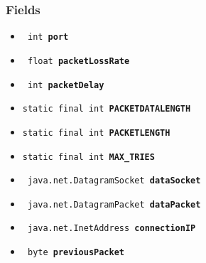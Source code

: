 {{{{\subsubsection{Fields}{
\begin{itemize}
\item{
\label{filetransferUDP.FileTransfer.port}\hypertarget{filetransferUDP.FileTransfer.port}{\texttt{ int\ {\bf  port}}
}
}
\item{
\label{filetransferUDP.FileTransfer.packetLossRate}\hypertarget{filetransferUDP.FileTransfer.packetLossRate}{\texttt{ float\ {\bf  packetLossRate}}
}
}
\item{
\label{filetransferUDP.FileTransfer.packetDelay}\hypertarget{filetransferUDP.FileTransfer.packetDelay}{\texttt{ int\ {\bf  packetDelay}}
}
}
\item{
\label{filetransferUDP.FileTransfer.PACKETDATALENGTH}\hypertarget{filetransferUDP.FileTransfer.PACKETDATALENGTH}{\texttt{static final int\ {\bf  PACKETDATALENGTH}}
}
}
\item{
\label{filetransferUDP.FileTransfer.PACKETLENGTH}\hypertarget{filetransferUDP.FileTransfer.PACKETLENGTH}{\texttt{static final int\ {\bf  PACKETLENGTH}}
}
}
\item{
\label{filetransferUDP.FileTransfer.MAX_TRIES}\hypertarget{filetransferUDP.FileTransfer.MAX_TRIES}{\texttt{static final int\ {\bf  MAX\_TRIES}}
}
}
\item{
\label{filetransferUDP.FileTransfer.dataSocket}\hypertarget{filetransferUDP.FileTransfer.dataSocket}{\texttt{ java.net.DatagramSocket\ {\bf  dataSocket}}
}
}
\item{
\label{filetransferUDP.FileTransfer.dataPacket}\hypertarget{filetransferUDP.FileTransfer.dataPacket}{\texttt{ java.net.DatagramPacket\ {\bf  dataPacket}}
}
}
\item{
\label{filetransferUDP.FileTransfer.connectionIP}\hypertarget{filetransferUDP.FileTransfer.connectionIP}{\texttt{ java.net.InetAddress\ {\bf  connectionIP}}
}
}
\item{
\label{filetransferUDP.FileTransfer.previousPacket}\hypertarget{filetransferUDP.FileTransfer.previousPacket}{\texttt{ byte\lbrack \rbrack \ {\bf  previousPacket}}
}}
\end{itemize}}}}}}
